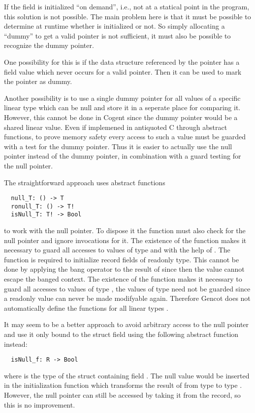 If the field  is initialized ``on demand'', i.e., not at a statical point in the program, this solution is not possible.
The main problem here is that it must be possible to determine at runtime whether  is initialized or not. So simply
allocating a ``dummy'' to get a valid pointer is not sufficient, it must also be possible to recognize the dummy pointer.

One possibility for this is if the data structure referenced by the pointer has a field value which never occurs for a valid
pointer. Then it can be used to mark the pointer as dummy.

Another possibility is to use a single dummy pointer for all values of a specific linear type which can be null and store it 
in a seperate place for comparing it. However, this cannot be done in Cogent since the dummy pointer would be a shared linear 
value. Even if implemened in antiquoted C through abstract functions, to prove memory safety every access to such a value must 
be guarded with a test for the dummy pointer. Thus it is easier to actually use the null pointer instead of the dummy pointer,
in combination with a guard testing for the null pointer.

The straightforward approach uses abstract functions
\begin{verbatim}
  null_T: () -> T
  ronull_T: () -> T!
  isNull_T: T! -> Bool
\end{verbatim}
to work with the null pointer. To dispose it the function  must also check for the null pointer and ignore
invocations for it. The existence of the function  makes it necessary to guard all accesses to values of type
 and  with the help of . The function  is required to initialize record fields 
of readonly type. This cannot be done by applying the bang operator to the result of  since then the value
cannot escape the banged context. The existence of the function  makes it necessary to guard
all accesses to values of type , the values of type  need not be guarded since a readonly value can never be 
made modifyable again. Therefore Gencot does not automatically define the functions for all 
linear types .

It may seem to be a better approach to avoid arbitrary access to the null pointer and use it only bound to the struct field
using the following abstract function instead:
\begin{verbatim}
  isNull_f: R -> Bool
\end{verbatim}
where  is the type of the struct containing field . The null value would be inserted in the initialization 
function which transforms the result of  from type  to type . However, the null 
pointer can still be accessed by taking it from the record, so this is no improvement.

